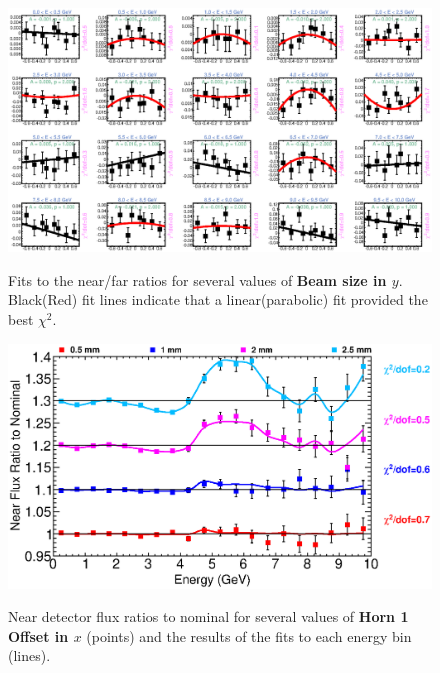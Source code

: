 \begin{figure}[ht]
  \begin{center}
    {\includegraphics[width=5.0in]{figures/BeamSigmaY_nof_fits.eps}}
  \end{center}
\caption{ Fits to the near/far ratios for several values of {\bf Beam size in $y$}. Black(Red) fit lines indicate that a linear(parabolic) fit provided the best $\chi^2$. }
\end{figure}

\clearpage

\begin{figure}[ht]
  \begin{center}
    {\includegraphics[width=6.0in]{figures/Horn1XOffset_near_summary.eps}}
  \end{center}
\caption{ Near detector flux ratios to nominal for several values of {\bf Horn 1 Offset in $x$} (points) and the results of the fits to each energy bin (lines).}
\end{figure}

